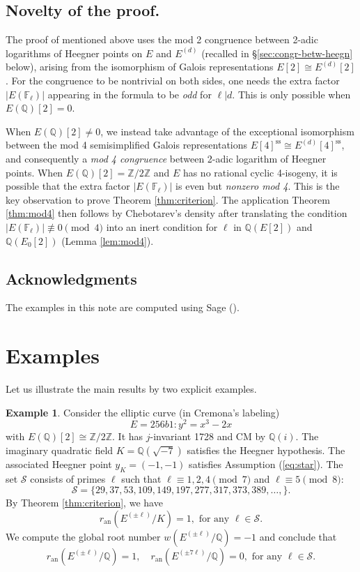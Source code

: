 \documentclass[11pt]{amsart}
\theoremstyle{definition}
\newtheorem{example}[theorem]{Example}
\begin{document}
\subsection{Novelty of the proof.} The proof of \cite[Thm. 3.3]{KrizLi2016a} mentioned above uses the mod 2 congruence between 2-adic logarithms of Heegner points on $E$ and $E^{(d)}$ (recalled in \S \ref{sec:congr-betw-heegn} below), arising from the isomorphism of Galois representations $E[2]\cong E^{(d)}[2]$. For the congruence to be nontrivial on both sides, one needs the extra factor $|E(\mathbb{F}_\ell)|$ appearing in the formula to be \emph{odd} for $\ell|d$. This is only possible when $E(\mathbb{Q})[2]=0$.

When $E(\mathbb{Q})[2]\ne0$, we instead take advantage of the exceptional isomorphism between the mod 4 semisimplified Galois representations $E[4]^\mathrm{ss}\cong E^{(d)}[4]^\mathrm{ss}$, and consequently a \emph{mod 4 congruence} between 2-adic logarithm of Heegner points. When $E(\mathbb{Q})[2]=\mathbb{Z}/2 \mathbb{Z}$ and $E$ has no rational cyclic 4-isogeny, it is possible that the extra factor $|E(\mathbb{F}_\ell)|$  is even but \emph{nonzero mod 4}. This is the key observation to prove Theorem \ref{thm:criterion}. The application Theorem \ref{thm:mod4} then follows by Chebotarev's density after translating the condition $|E(\mathbb{F}_\ell)|\not\equiv0\pmod{4}$ into an inert condition for $\ell$ in $\mathbb{Q}(E[2])$ and $\mathbb{Q}(E_0[2])$ (Lemma \ref{lem:mod4}).



\subsection{Acknowledgments}  The examples in this note are computed using Sage (\cite{sage}).

\section{Examples}

Let us illustrate the main results by two explicit examples.

\begin{example}
  Consider the elliptic curve (in Cremona's labeling) $$E=256b1: y^2=x^3-2x$$ with $E(\mathbb{Q})[2]\cong\mathbb{Z}/2 \mathbb{Z}$. It has $j$-invariant 1728 and CM by $\mathbb{Q}(i)$.  The imaginary quadratic field $K=\mathbb{Q}(\sqrt{-7})$ satisfies the Heegner hypothesis. The associated Heegner point $y_K=(-1,-1)$ satisfies Assumption (\ref{eq:star}). The set $\mathcal{S}$ consists of primes $\ell$ such that $\ell\equiv1,2,4\pmod{7}$ and $\ell\equiv5\pmod{8}$: $$\mathcal{S}=\{29,
 37,
 53,
 109,
 149,
 197,
 277,
 317,
 373,
 389,\ldots,\}.$$ By Theorem \ref{thm:criterion}, we have $$r_\mathrm{an}(E^{(\pm\ell)}/K)=1,\text{ for any } \ell\in\mathcal{S}.$$ We compute the global root number $w(E^{(\pm \ell)}/\mathbb{Q})=-1$ and conclude that $$r_\mathrm{an}(E^{(\pm \ell)}/\mathbb{Q})=1, \quad r_\mathrm{an}(E^{(\pm 7 \ell)}/\mathbb{Q})=0, \text{ for any } \ell\in \mathcal{S}.$$
\end{example}
\end{document}
